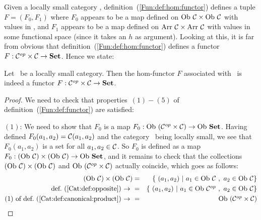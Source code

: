Given a locally small category \Cat, definition~(\ref{Fun:def:hom:functor}) 
defines a tuple $F=(F_{0},F_{1})$ where $F_{0}$ appears to be a map defined 
on $\ob\ \Cat\times\ob\ \Cat$ with values in \Set, and $F_{1}$ appears to be 
a map defined on $\arr\ \Cat\times\arr\ \Cat$ with values in some functional 
space (since it takes an $h$ as argument). Looking at this, it is far from 
obvious that definition~(\ref{Fun:def:hom:functor}) defines a functor 
$F:\mbox{${\cal C}^{op}$}\times\mbox{$\cal C$}\to\mbox{\bf Set}$. Hence we state:
\begin{prop}\label{Fun:prop:hom:functor}
    Let \Cat\ be a locally small category. Then the hom-functor $F$ associated 
    with \Cat\ is indeed a functor $F:\mbox{${\cal C}^{op}$}\times\mbox{$\cal C$}\to\mbox{\bf Set}$.
\end{prop}
\begin{proof}
    We need to check that properties~$(1)-(5)$ of 
    definition~(\ref{Fun:def:functor}) are satisfied:

    $(1)$: We need to show that $F_{0}$ is a map $F_{0}:\mbox{\rm Ob}\ (\mbox{${\cal C}^{op}$}\times\mbox{$\cal C$})
    \to\mbox{\rm Ob}\ \mbox{\bf Set}$. Having defined $F_{0}(a_{1},a_{2})=\mbox{$\cal C$}(a_{1},a_{2})$ and
    the category \Cat\ being locally small, we see that $F_{0}(a_{1},a_{2})$
    is a set for all $a_{1},a_{2}\in\mbox{$\cal C$}$. So $F_{0}$ is defined as a map
    $F_{0}:(\ob\ \Cat)\times(\ob\ \Cat)\to\ob\ \Set$, and it remains to check
    that the collections $(\ob\ \Cat)\times(\ob\ \Cat)$ and $\mbox{\rm Ob}\ (\mbox{${\cal C}^{op}$}\times
    \mbox{$\cal C$})$ actually coincide, which goes as follows:
        \begin{eqnarray*}(\ob\ \Cat)\times(\ob\ \Cat)
            &=&\{\ (a_{1},a_{2})\ |\ a_{1}\in\ob\ \Cat\ ,\ a_{2}\in\ob\ \Cat\}\\
            \mbox{def.~(\ref{Cat:def:opposite})\ $\to$\ }
            &=&\{\ (a_{1},a_{2})\ |\ a_{1}\in\ob\ \Cop\ ,\ a_{2}\in\ob\ \Cat\}\\
            \mbox{$(1)$ of def.~(\ref{Cat:def:canonical:product})\ $\to$\ }
            &=&\ob\ (\Cop\times\Cat)
        \end{eqnarray*}


\end{proof}
